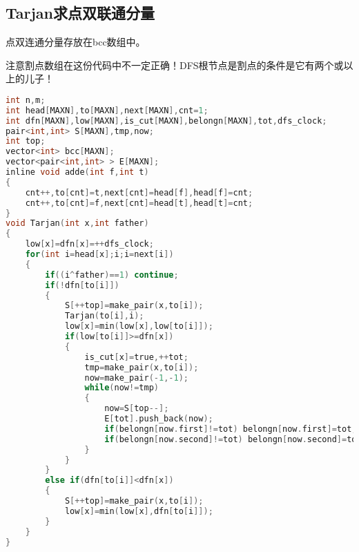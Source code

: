 \subsection{Tarjan求点双联通分量}
点双连通分量存放在bcc数组中。

注意割点数组在这份代码中不一定正确！DFS根节点是割点的条件是它有两个或以上的儿子！
\begin{lstlisting}[language=C]
int n,m;
int head[MAXN],to[MAXN],next[MAXN],cnt=1;
int dfn[MAXN],low[MAXN],is_cut[MAXN],belongn[MAXN],tot,dfs_clock;
pair<int,int> S[MAXN],tmp,now;
int top;
vector<int> bcc[MAXN];
vector<pair<int,int> > E[MAXN];
inline void adde(int f,int t)
{
	cnt++,to[cnt]=t,next[cnt]=head[f],head[f]=cnt;
	cnt++,to[cnt]=f,next[cnt]=head[t],head[t]=cnt;
}
void Tarjan(int x,int father)
{
	low[x]=dfn[x]=++dfs_clock;
	for(int i=head[x];i;i=next[i])
	{
		if((i^father)==1) continue;
		if(!dfn[to[i]])
		{
			S[++top]=make_pair(x,to[i]);
			Tarjan(to[i],i);
			low[x]=min(low[x],low[to[i]]);
			if(low[to[i]]>=dfn[x])
			{
				is_cut[x]=true,++tot;
				tmp=make_pair(x,to[i]);
				now=make_pair(-1,-1);
				while(now!=tmp)
				{
					now=S[top--];
					E[tot].push_back(now);
					if(belongn[now.first]!=tot) belongn[now.first]=tot,bcc[tot].push_back(now.first);
					if(belongn[now.second]!=tot) belongn[now.second]=tot,bcc[tot].push_back(now.second);
				}
			}
		}
		else if(dfn[to[i]]<dfn[x])
		{
			S[++top]=make_pair(x,to[i]);
			low[x]=min(low[x],dfn[to[i]]);
		}
	}
}
\end{lstlisting}